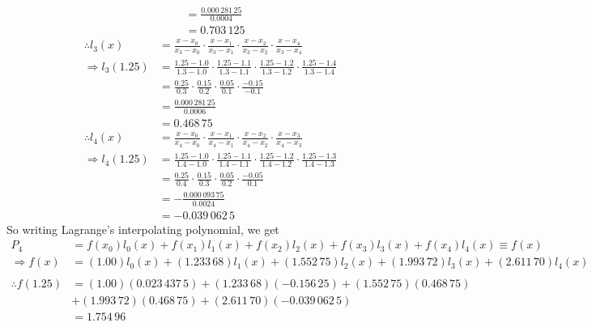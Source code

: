 \documentclass[12pt,class=book,crop=false]{standalone}
\begin{document}
\begin{soln}
\begin{align*}
                              & = \frac{0.000\,281\,25}{0.0004}                                                                                       \\
                              & = 0.703\,125
    \end{align*}
    \begin{align*}
        \therefore l_3(x)     & = \frac{x-x_0}{x_3-x_0}\cdot\frac{x-x_1}{x_3-x_1}\cdot\frac{x-x_2}{x_3-x_2}\cdot\frac{x-x_4}{x_3-x_4}             \\
        \Rightarrow l_3(1.25) & = \frac{1.25-1.0}{1.3-1.0}\cdot\frac{1.25-1.1}{1.3-1.1}\cdot\frac{1.25-1.2}{1.3-1.2}\cdot\frac{1.25-1.4}{1.3-1.4} \\
                              & = \frac{0.25}{0.3}\cdot\frac{0.15}{0.2}\cdot\frac{0.05}{0.1}\cdot\frac{-0.15}{-0.1}                               \\
                              & = \frac{0.000\,281\,25}{0.0006}                                                                                       \\
                              & = 0.468\,75
    \end{align*}
    \begin{align*}
        \therefore l_4(x)     & = \frac{x-x_0}{x_4-x_0}\cdot\frac{x-x_1}{x_4-x_1}\cdot\frac{x-x_2}{x_4-x_2}\cdot\frac{x-x_3}{x_4-x_3}             \\
        \Rightarrow l_4(1.25) & = \frac{1.25-1.0}{1.4-1.0}\cdot\frac{1.25-1.1}{1.4-1.1}\cdot\frac{1.25-1.2}{1.4-1.2}\cdot\frac{1.25-1.3}{1.4-1.3} \\
                              & = \frac{0.25}{0.4}\cdot\frac{0.15}{0.3}\cdot\frac{0.05}{0.2}\cdot\frac{-0.05}{0.1}                                \\
                              & = -\frac{0.000\,093\,75}{0.0024}                                                                                      \\
                              & = -0.039\,062\,5
    \end{align*}
    So writing Lagrange's interpolating polynomial, we get
    \begin{align*}
        P_4                & = f(x_0)l_0(x)+f(x_1)l_1(x)+f(x_2)l_2(x)+f(x_3)l_3(x)+f(x_4)l_4(x) \equiv f(x)      \\
        \Rightarrow f(x)   & = (1.00) l_0(x)+(1.233\,68) l_1(x)+(1.552\,75) l_2(x)+(1.993\,72) l_3(x)+(2.611\,70) l_4(x) \\
                           &                                                                                     \\
        \therefore f(1.25) & = (1.00 )(0.023\,437\,5 )+(1.233\,68)(-0.156\,25)+(1.552\,75) (0.468\,75)                       \\
                           & +(1.993\,72)(0.468\,75)+(2.611\,70)(-0.039\,062\,5)                                           \\
                           & =1.754\,96
    \end{align*}
\end{soln}
\end{document}
